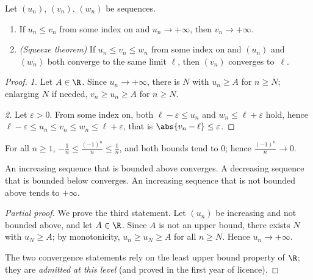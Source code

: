 \begin{theorem}\label{thm:tle:seq:squeeze}
Let $(u_n)$, $(v_n)$, $(w_n)$ be sequences.
\begin{enumerate}
  \item If $u_n \leq v_n$ from some index on and $u_n \to +\infty$, then
        $v_n \to +\infty$.
  \item \emph{(Squeeze theorem)} If
        $u_n \leq v_n \leq w_n$ from some index on and $(u_n)$ and $(w_n)$
        both converge to the same limit $\ell$, then $(v_n)$ converges
        to~$\ell$.
\end{enumerate}
\end{theorem}

\begin{proof}
\emph{1.} Let $A \in \R$. Since $u_n \to +\infty$, there is $N$ with
$u_n \geq A$ for $n \geq N$; enlarging $N$ if needed, $v_n \geq u_n \geq A$
for $n \geq N$.

\emph{2.} Let $\varepsilon > 0$. From some index on, both
$\ell - \varepsilon \leq u_n$ and $w_n \leq \ell + \varepsilon$ hold, hence
$\ell - \varepsilon \leq u_n \leq v_n \leq w_n \leq \ell + \varepsilon$, that
is $\abs{v_n - \ell} \leq \varepsilon$.
\end{proof}

\begin{example}
For all $n \geq 1$, $-\frac{1}{n} \leq \frac{(-1)^n}{n} \leq \frac{1}{n}$, and
both bounds tend to $0$; hence $\frac{(-1)^n}{n} \to 0$.
\end{example}

\begin{theorem}\label{thm:tle:seq:monotone}
An increasing sequence that is bounded above converges. A decreasing sequence
that is bounded below converges. An increasing sequence that is not bounded
above tends to $+\infty$.
\end{theorem}

\begin{proof}[Partial proof]
We prove the third statement. Let $(u_n)$ be increasing and not bounded
above, and let $A \in \R$. Since $A$ is not an upper bound, there exists $N$
with $u_N \geq A$; by monotonicity, $u_n \geq u_N \geq A$ for all $n \geq N$.
Hence $u_n \to +\infty$.

The two convergence statements rely on the least upper bound property of
$\R$; they are \emph{admitted at this level} (and proved in the first year of
licence).
\end{proof}

